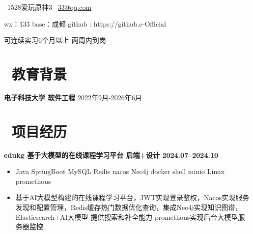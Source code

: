 \documentclass[11pt]{article}
\begin{document}
\centerline{\normalsize{
		\faPhone \ 1528爱玩原神3 \quad
		\faEnvelopeO \ \href{mailto:mxd@mail.bnu.edu.cn}{33@qq.com}}}

\centerline{\normalsize{wx：133 \quad base：成都 \quad github : https://github.c-Official }}
\centerline{\normalsize{可连续实习6个月以上 \quad 两周内到岗}}







\section{\makebox[\widthof{\faGraduationCap}][c]{\color{CVBlue}\faGraduationCap}\  教育背景}
\textbf{电子科技大学 \quad 软件工程 }           \hfill             2022年9月-2026年6月






\section{\makebox[\widthof{\faGraduationCap}][c]{\color{CVBlue}\faUsers}\ 项目经历}

\textbf{edukg  基于大模型的在线课程学习平台  \hfill 后端+设计  2024.07--2024.10\\}
\begin{itemize}
    \item Java SpringBoot   MySQL Redis   nacos  Neo4j docker  shell  minio   Linux promethous

    \item 基于AI大模型构建的在线课程学习平台，JWT实现登录鉴权，Nacos实现服务发现和配置管理，Redis缓存热门数据优化查询，集成Neo4j实现知识图谱，Elasticsearch+AI大模型 提供搜索和补全能力   promethous实现后台大模型服务器监控 
\end{itemize}
\end{document}
